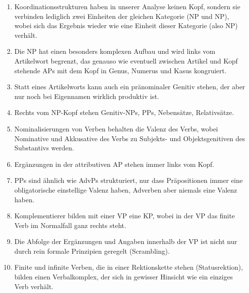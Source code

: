 \begin{enumerate}\Lf
  \item Koordinationsstrukturen haben in unserer Analyse keinen Kopf, sondern sie verbinden lediglich zwei Einheiten der gleichen Kategorie (\zB NP und NP), wobei sich das Ergebnis wieder wie eine Einheit dieser Kategorie (also \zB NP) verhält.
  \item Die NP hat einen besonders komplexen Aufbau und wird links vom Artikelwort begrenzt, das genauso wie eventuell zwischen Artikel und Kopf stehende APs mit dem Kopf in Genus, Numerus und Kasus kongruiert.
  \item Statt eines Artikelworts kann auch ein pränominaler Genitiv stehen, der aber nur noch bei Eigennamen wirklich produktiv ist.
  \item Rechts vom NP-Kopf stehen Genitiv-NPs, PPs, Nebensätze, Relativsätze.
  \item Nominalisierungen von Verben behalten die Valenz des Verbs, wobei Nominative und Akkusative des Verbs zu Subjekts- und Objektsgenitiven des Substantivs werden.
  \item Ergänzungen in der attributiven AP stehen immer links vom Kopf.
  \item PPs sind ähnlich wie AdvPs strukturiert, nur dass Präpositionen immer eine obligatorische einstellige Valenz haben, Adverben aber niemals eine Valenz haben.
  \item Komplementierer bilden mit einer VP eine KP, wobei in der VP das finite Verb im Normalfall ganz rechts steht.
  \item Die Abfolge der Ergänzungen und Angaben innerhalb der VP ist nicht nur durch rein formale Prinzipien geregelt (Scrambling).
  \item Finite und infinite Verben, die in einer Rektionskette stehen (Statusrektion), bilden einen Verbalkomplex, der sich in gewisser Hinsicht wie ein einziges Verb verhält.
\end{enumerate}

\Uebungen

